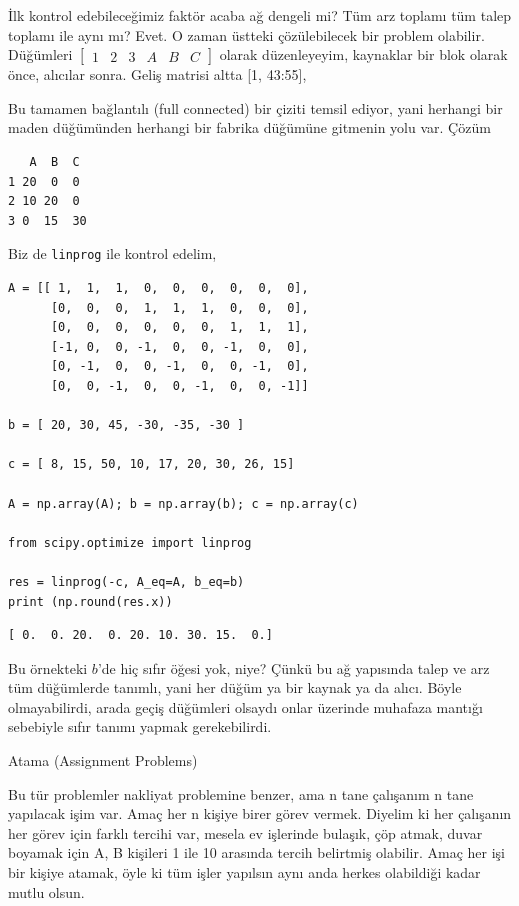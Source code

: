 \documentclass[12pt,fleqn]{article}\usepackage{../../common}
\begin{document}
İlk kontrol edebileceğimiz faktör acaba ağ dengeli mi? Tüm arz toplamı tüm
talep toplamı ile aynı mı? Evet. O zaman üstteki çözülebilecek bir
problem olabilir. Düğümleri $\left[\begin{array}{cccccc} 1&2&3&A&B&C \end{array}\right]$
olarak düzenleyeyim, kaynaklar bir blok olarak önce, alıcılar sonra. Geliş
matrisi altta [1, 43:55],

Bu tamamen bağlantılı (full connected) bir çiziti temsil ediyor, yani
herhangi bir maden düğümünden herhangi bir fabrika düğümüne gitmenin yolu
var. Çözüm

\begin{verbatim}
   A  B  C
1 20  0  0 
2 10 20  0
3 0  15  30
\end{verbatim}

Biz de \verb!linprog! ile kontrol edelim,

\begin{verbatim}
A = [[ 1,  1,  1,  0,  0,  0,  0,  0,  0],
      [0,  0,  0,  1,  1,  1,  0,  0,  0],
      [0,  0,  0,  0,  0,  0,  1,  1,  1],
      [-1, 0,  0, -1,  0,  0, -1,  0,  0],
      [0, -1,  0,  0, -1,  0,  0, -1,  0],
      [0,  0, -1,  0,  0, -1,  0,  0, -1]]

b = [ 20, 30, 45, -30, -35, -30 ]

c = [ 8, 15, 50, 10, 17, 20, 30, 26, 15]

A = np.array(A); b = np.array(b); c = np.array(c)

from scipy.optimize import linprog

res = linprog(-c, A_eq=A, b_eq=b)
print (np.round(res.x))
\end{verbatim}

\begin{verbatim}
[ 0.  0. 20.  0. 20. 10. 30. 15.  0.]
\end{verbatim}

Bu örnekteki $b$'de hiç sıfır öğesi yok, niye? Çünkü bu ağ yapısında talep
ve arz tüm düğümlerde tanımlı, yani her düğüm ya bir kaynak ya da
alıcı. Böyle olmayabilirdi, arada geçiş düğümleri olsaydı onlar üzerinde
muhafaza mantığı sebebiyle sıfır tanımı yapmak gerekebilirdi. 

Atama (Assignment Problems)

Bu tür problemler nakliyat problemine benzer, ama n tane çalışanım n tane
yapılacak işim var. Amaç her n kişiye birer görev vermek. Diyelim ki her
çalışanın her görev için farklı tercihi var, mesela ev işlerinde bulaşık,
çöp atmak, duvar boyamak için A, B kişileri 1 ile 10 arasında tercih
belirtmiş olabilir. Amaç her işi bir kişiye atamak, öyle ki tüm işler
yapılsın aynı anda herkes olabildiği kadar mutlu olsun. 
\end{document}
